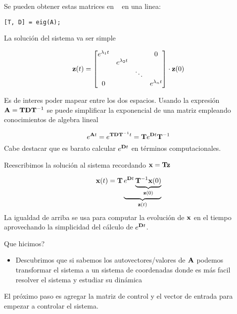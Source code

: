 Se pueden obtener estas matrices en \Matlab~ en una linea:
\begin{lstlisting}
[T, D] = eig(A);
\end{lstlisting}

La solución del sistema va ser simple

\[
\mathbf{z}(t) = \begin{bmatrix}
e^{\lambda_1 t} & & & 0 \\
 &e^{\lambda_2 t}& &  \\
 & &\ddots &  \\
  0& & & e^{\lambda_{n} t} \\
\end{bmatrix} \cdot \mathbf{z}(0)
\]

Es de interes poder mapear entre los dos espacios. Usando la expresión \( \mathbf{A} = \mathbf{T} \mathbf{D} \mathbf{T}^{-1}\) se puede simplificar la exponencial de una matriz empleando conocimientos de algebra lineal

\[
e^{\mathbf{A}t} = e^{\mathbf{T} \mathbf{D} \mathbf{T}^{-1}t} = \mathbf{T} e^{\mathbf{D}t} \mathbf{T}^{-1}
\]
Cabe destacar que es barato calcular \( e^{\mathbf{D}t}\) en términos computacionales. 

Reescribimos la solución al sistema recordando \(\mathbf{x} = \mathbf{T}\mathbf{z}\)

\[
\mathbf{x}(t) = \mathbf{T}  \underbrace{e^{\mathbf{D}t} \underbrace{\mathbf{T}^{-1} \mathbf{x}(0)}_{\mathbf{z}(0)}}_{\mathbf{z}(t)}
\]
La igualdad de arriba se usa para computar la evolución de $\mathbf{x}$ en el tiempo aprovechando la simplicidad del cálculo de \(e^{\mathbf{D}t}\). 

Que hicimos?
\begin{itemize}
	\item Descubrimos que si sabemos los autovectores/valores de \(\mathbf{A}\) podemos transformar el sistema a un sistema de coordenadas donde es más facil resolver el sistema y estudiar su dinámica
\end{itemize}
 
El próximo paso es agregar la matriz de control y el vector de entrada para empezar a controlar el sistema.

